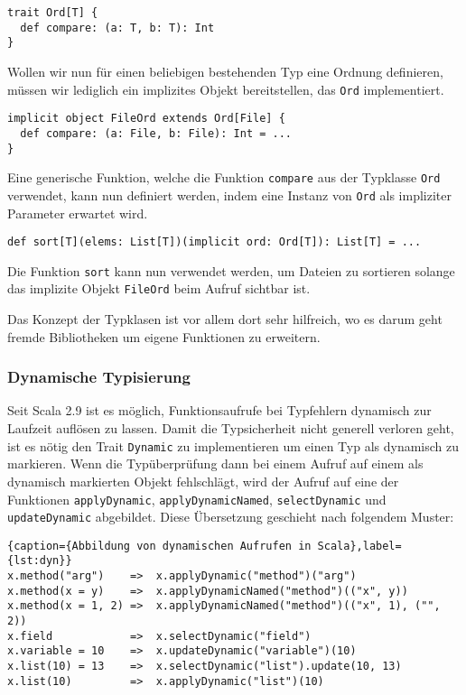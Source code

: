 \begin{lstlisting}
trait Ord[T] {
  def compare: (a: T, b: T): Int
}
\end{lstlisting}

Wollen wir nun für einen beliebigen bestehenden Typ eine Ordnung definieren, müssen wir lediglich
ein implizites Objekt bereitstellen, das \texttt{Ord} implementiert.

\begin{lstlisting}
implicit object FileOrd extends Ord[File] {
  def compare: (a: File, b: File): Int = ...
}
\end{lstlisting}

Eine generische Funktion, welche die Funktion \texttt{compare} aus der Typklasse \texttt{Ord}
verwendet, kann nun definiert werden, indem eine Instanz von \texttt{Ord} als impliziter Parameter
erwartet wird.

\begin{lstlisting}
def sort[T](elems: List[T])(implicit ord: Ord[T]): List[T] = ...
\end{lstlisting}

Die Funktion \texttt{sort} kann nun verwendet werden, um Dateien zu sortieren solange das implizite
Objekt \texttt{FileOrd} beim Aufruf sichtbar ist.

Das Konzept der Typklasen ist vor allem dort sehr hilfreich, wo es darum geht fremde  Bibliotheken um
eigene Funktionen zu erweitern.

\subsubsection{Dynamische Typisierung}
\label{sec:dyn}

Seit Scala 2.9 ist es möglich, Funktionsaufrufe bei Typfehlern dynamisch zur  Laufzeit auflösen zu
lassen. Damit die Typsicherheit nicht generell verloren  geht, ist es nötig den Trait
\texttt{Dynamic} zu implementieren um einen Typ als dynamisch zu markieren. Wenn die Typüberprüfung
dann bei einem Aufruf auf einem als dynamisch markierten Objekt fehlschlägt, wird der Aufruf auf
eine der Funktionen \texttt{applyDynamic}, \texttt{applyDynamicNamed}, \texttt{selectDynamic} und
\texttt{updateDynamic}  abgebildet. Diese Übersetzung geschieht nach folgendem Muster:

\begin{lstlisting}{caption={Abbildung von dynamischen Aufrufen in Scala},label={lst:dyn}}
x.method("arg")    =>  x.applyDynamic("method")("arg")
x.method(x = y)    =>  x.applyDynamicNamed("method")(("x", y))
x.method(x = 1, 2) =>  x.applyDynamicNamed("method")(("x", 1), ("", 2))
x.field            =>  x.selectDynamic("field")
x.variable = 10    =>  x.updateDynamic("variable")(10)
x.list(10) = 13    =>  x.selectDynamic("list").update(10, 13)
x.list(10)         =>  x.applyDynamic("list")(10)
\end{lstlisting}
 
